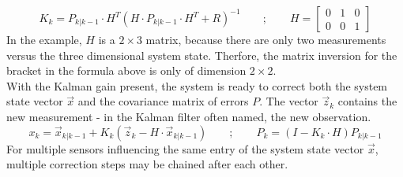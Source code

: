 \begin{equation*}
    K_{k} = P_{k|k-1}\cdot H^{T}(H\cdot P_{k|k-1}\cdot H^{T}+R)^{-1}
    \qquad ; \qquad
    H=
    \begin{bmatrix}
        0 & 1 & 0 \\
        0 & 0 & 1
    \end{bmatrix}
\end{equation*}
In the example, $H$ is a $2\times 3$ matrix, because there are only two measurements versus the three dimensional system state. Therfore, the matrix inversion for the bracket in the formula above is only of dimension $2\times 2$.\\
With the Kalman gain present, the system is ready to correct both the system state vector $\vec{x}$ and the covariance matrix of errors $P$. The vector $\vec{z}_{k}$ contains the new measurement - in the Kalman filter often named, the new observation.
\begin{equation*}
    x_{k} = \vec{x}_{k|k-1}+K_{k}(\vec{z}_{k}-H\cdot \vec{x}_{k|k-1})
    \qquad ; \qquad
    P_{k}= (I-K_{k}\cdot H)P_{k|k-1}
\end{equation*}
For multiple sensors influencing the same entry of the system state vector $\vec{x}$, multiple correction steps may be chained after each other.